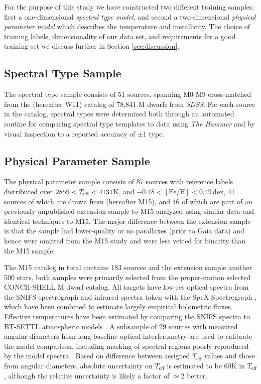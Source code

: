 \documentclass[twocolumn]{aastex62}
\newcommand{\sdss}{\textsl{SDSS}}
\newcommand{\teff}{T_{\mathrm{eff}}}
\newcommand{\feh}{[{\mathrm{Fe}/\mathrm{H}}]}
\begin{document}
For the purpose of this study we have constructed two different training samples: first a one-dimensional \emph{spectral type model}, and second a two-dimensional \emph{physical parameter model} which describes the temperature and metallicity. The choice of training labels, dimensionality of our data set, and requirements for a good training set we discuss further in Section \ref{sec:discussion}.

\subsection{Spectral Type Sample}

The spectral type sample consists of 51 sources, spanning M0-M9 cross-matched from the \citealt{West:2011} (hereafter W11) catalog of 78,841 M dwarfs from \sdss. For each source in the catalog, spectral types were determined both through an automated routine for comparing spectral type templates to data using \textsl{The Hammer} \citep{Covey:2007} and by visual inspection to a reported accuracy of $\pm$1 type.

\subsection{Physical Parameter Sample}

The physical parameter sample consists of 87 sources with reference labels distributed over $2859 <T_{\rm eff} < 4131$K, and $-0.48 < \feh < 0.49$\,dex, 41 sources of which are drawn from \citealt{Mann:2015} (hereafter M15), and 46 of which are part of an previously unpublished extension sample to M15 analyzed using similar data and identical techniques to M15. The major difference between the extension sample is that the sample had lower-quality or no parallaxes (prior to Gaia data) and hence were omitted from the M15 study and were less vetted for binarity than the M15 sample.

The M15 catalog in total contains 183 sources and the extension sample another 500 stars, both samples were primarily selected from the proper-motion selected CONCH-SHELL \citep{Gaidos:2013} M dwarf catalog. All targets have low-res optical spectra from the SNIFS spectrograph \citep{Lantz:2004} and infrared spectra taken with the SpeX Spectrograph \citep{Rayner:2003}, which have been combined to estimate largely empirical bolometric fluxes. Effective temperatures have been estimated by comparing the SNIFS spectra to BT-SETTL atmospheric models \citep{Allard:2011}. A subsample of 29 sources with measured angular diameters from long-baseline optical interferometry \citep{Boyajian:2012} are used to calibrate the model comparison, including masking of spectral regions poorly reproduced by the model spectra \citep{Mann:2013c}. Based on difference between assigned $\teff$ values and those from angular diameters, absolute uncertainty on $\teff$ is estimated to be 60K in $\teff$, although the relative uncertainty is likely a factor of $\simeq$2 better.
\end{document}
